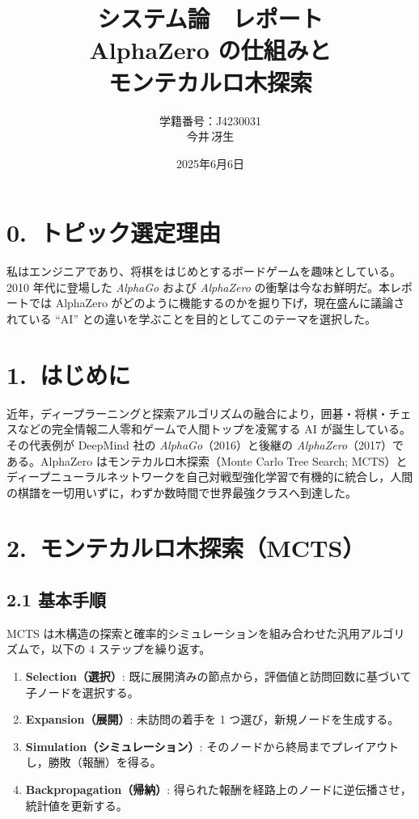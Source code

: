 \documentclass[a4paper,12pt]{article}
\title{システム論　レポート\\AlphaZero の仕組みと\\モンテカルロ木探索}
\author{学籍番号：J4230031\\今井\,冴生}
\date{2025年6月6日}
\begin{document}
\begin{CJK}{UTF8}{min} %

\maketitle
\thispagestyle{empty}

\section*{0.~トピック選定理由}
私はエンジニアであり、将棋をはじめとするボードゲームを趣味としている。2010 年代に登場した \textit{AlphaGo} および \textit{AlphaZero} の衝撃は今なお鮮明だ。本レポートでは AlphaZero がどのように機能するのかを掘り下げ，現在盛んに議論されている ``AI'' との違いを学ぶことを目的としてこのテーマを選択した。

\section*{1.~はじめに}
近年，ディープラーニングと探索アルゴリズムの融合により，囲碁・将棋・チェスなどの完全情報二人零和ゲームで人間トップを凌駕する AI が誕生している。その代表例が DeepMind 社の \textit{AlphaGo}（2016）と後継の \textit{AlphaZero}（2017）である。AlphaZero はモンテカルロ木探索（Monte Carlo Tree Search; MCTS）とディープニューラルネットワークを自己対戦型強化学習で有機的に統合し，人間の棋譜を一切用いずに，わずか数時間で世界最強クラスへ到達した。

\section*{2.~モンテカルロ木探索（MCTS）}
\subsection*{2.1 基本手順}
MCTS は木構造の探索と確率的シミュレーションを組み合わせた汎用アルゴリズムで，以下の 4 ステップを繰り返す。
\begin{enumerate}
  \item \textbf{Selection（選択）}: 既に展開済みの節点から，評価値と訪問回数に基づいて子ノードを選択する。
  \item \textbf{Expansion（展開）}: 未訪問の着手を 1 つ選び，新規ノードを生成する。
  \item \textbf{Simulation（シミュレーション）}: そのノードから終局までプレイアウトし，勝敗（報酬）を得る。
  \item \textbf{Backpropagation（帰納）}: 得られた報酬を経路上のノードに逆伝播させ，統計値を更新する。
\end{enumerate}


\end{CJK}
\end{document}
